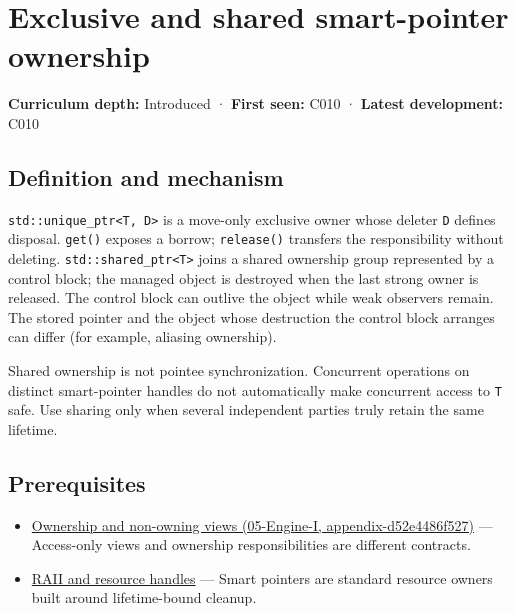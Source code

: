 \hypertarget{appendix-51602cabe815}{}
\section{Exclusive and shared smart-pointer ownership}\label{appendix-51602cabe815-exclusive-and-shared-smart-pointer-ownership}

\textbf{Curriculum depth:} Introduced · \textbf{First seen:} C010 · \textbf{Latest development:} C010

\subsection{Definition and mechanism}\label{appendix-51602cabe815-definition-and-mechanism}

\texttt{std::unique\_ptr\textless{}T,\ D\textgreater{}} is a move-only exclusive owner whose deleter \texttt{D} defines disposal. \texttt{get()} exposes a borrow; \texttt{release()} transfers the responsibility without deleting. \texttt{std::shared\_ptr\textless{}T\textgreater{}} joins a shared ownership group represented by a control block; the managed object is destroyed when the last strong owner is released. The control block can outlive the object while weak observers remain. The stored pointer and the object whose destruction the control block arranges can differ (for example, aliasing ownership).

Shared ownership is not pointee synchronization. Concurrent operations on distinct smart-pointer handles do not automatically make concurrent access to \texttt{T} safe. Use sharing only when several independent parties truly retain the same lifetime.

\subsection{Prerequisites}\label{appendix-51602cabe815-prerequisites}

\begin{itemize}
\tightlist
\item
  \href{../05-Engine-I/main.pdf\#nameddest=appendix-d52e4486f527}{Ownership and non-owning views (05-Engine-I, appendix-d52e4486f527)} --- Access-only views and ownership responsibilities are different contracts.
\item
  \hyperref[appendix-69739d3ab49b]{RAII and resource handles} --- Smart pointers are standard resource owners built around lifetime-bound cleanup.
\end{itemize}


